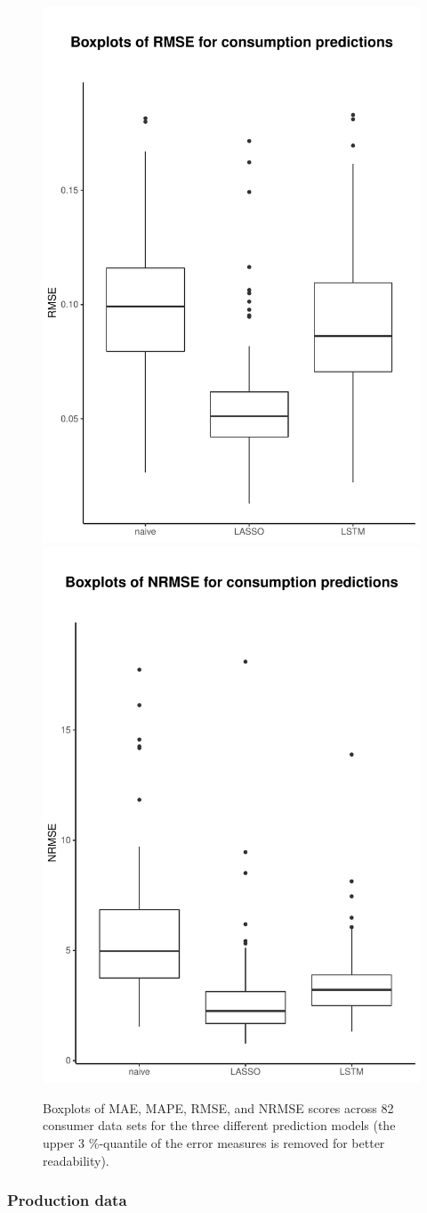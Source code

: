 \begin{figure}
    \includegraphics[width=.5\textwidth-0.15em]{thesis/graphs/evaluation/c_boxplot_RMSE.pdf}
    \includegraphics[width=.5\textwidth-0.15em]{thesis/graphs/evaluation/c_boxplot_NRMSE.pdf} \\
    \caption[Boxplots of MAE, MAPE, RMSE, and NRMSE scores across 82 consumer data sets]{Boxplots of MAE, MAPE, RMSE, and NRMSE scores across 82 consumer data sets for the three different prediction models (the upper 3 \%-quantile of the error measures is removed for better readability). \quantnet\href{}{}}
    \label{Fig:boxplots_errormeasures}
\end{figure}


\subsubsection{Production data}




